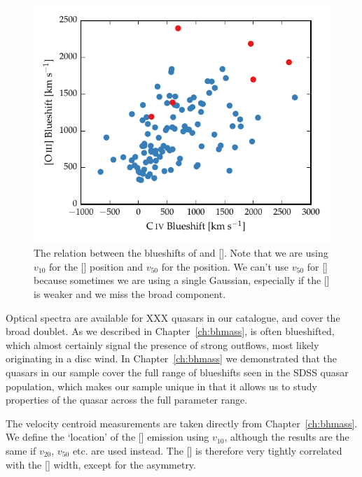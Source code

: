 \begin{figure}
    \includegraphics[width=\columnwidth]{figures/chapter04/civ_blueshift_oiii_blueshift.pdf} 
    \caption{The relation between the blueshifts of  and []. Note that we are using $v_{10}$ for the [] position and $v_{50}$ for the  position. We can't use $v_{50}$ for [] because sometimes we are using a single Gaussian, especially if the [] is weaker and we miss the broad component.}     
    \label{fig:oiii_civ_blueshifts}
\end{figure}

Optical spectra are available for XXX quasars in our catalogue, and cover the broad  doublet. 
As we described in Chapter~\ref{ch:bhmass},  is often blueshifted, which almost certainly signal the presence of strong outflows, most likely originating in a disc wind.
In Chapter~\ref{ch:bhmass} we demonstrated that the quasars in our sample cover the full range of  blueshifts seen in the SDSS quasar population, which makes our sample unique in that it allows us to study properties of the quasar across the full parameter range. 

The  velocity centroid measurements are taken directly from Chapter~\ref{ch:bhmass}. 
We define the `location' of the [] emission using $v_{10}$, although the results are the same if $v_{20}$, $v_{50}$ etc. are used instead.
The [] is therefore very tightly correlated with the [] width, except for the asymmetry. 

